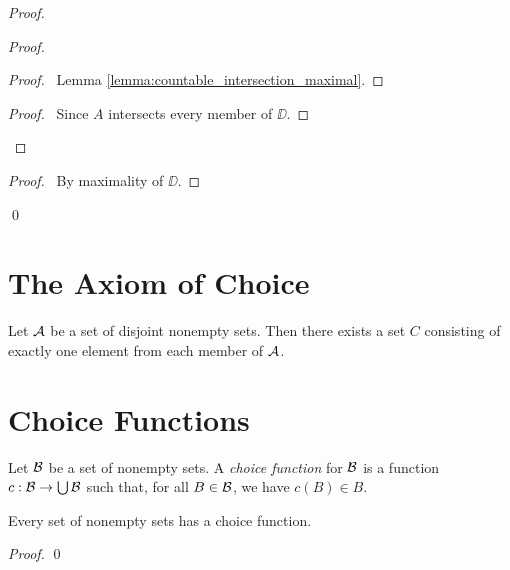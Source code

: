 \begin{proof}
    \pf
    \begin{proof}
        \begin{proof}
            \pf\ Lemma \ref{lemma:countable_intersection_maximal}.
        \end{proof}
        \begin{proof}
            \pf\ Since $A$ intersects every member of $\DD$.
        \end{proof}
    \end{proof}
    \qedstep
    \begin{proof}
        \pf\ By maximality of $\DD$.
    \end{proof}
    \qed
\end{proof}

\section{The Axiom of Choice}

\begin{axiom}
    Let $\AA$ be a set of disjoint nonempty sets. Then there exists a set $C$ consisting of exactly one element from each member of $\AA$.
\end{axiom}

\section{Choice Functions}

\begin{definition}
    Let $\BB$ be a set of nonempty sets. A \emph{choice function} for $\BB$ is a function $c : \BB \rightarrow \bigcup \BB$ such that, for all $B \in \BB$,
    we have $c(B) \in B$.
\end{definition}

\begin{lemma}
    \label{lemma:choice_function}
    Every set of nonempty sets has a choice function.
\end{lemma}

\begin{proof}
    \pf
    \qed
\end{proof}